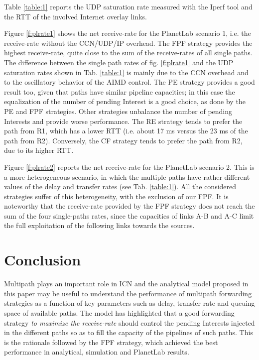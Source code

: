 \documentclass{sig-alternate-10pt}
\begin{document}
Table \ref{table:1} reports the UDP saturation rate measured with the Iperf tool and the RTT of the involved Internet overlay links.

Figure \ref{f:plrate1} shows the net receive-rate for the PlanetLab scenario 1, i.e. the receive-rate without the CCN/UDP/IP overhead. The FPF strategy provides the highest receive-rate, quite close to the sum of the receive-rates of all single paths. The difference between the single path rates of fig. \ref{f:plrate1} and the UDP saturation rates shown in Tab. \ref{table:1} is mainly due to the CCN overhead and to the oscillatory behavior of the AIMD control. The PE strategy provides a good result too, given that paths have similar pipeline capacities; in this case the equalization of the number of pending Interest is a good choice, as done by the PE and FPF strategies. Other strategies unbalance the number of pending Interests and provide worse performance. The RE strategy tends to prefer the path from R1, which has a lower RTT (i.e. about 17 ms versus the 23 ms of the path from R2). Conversely, the CF strategy tends to prefer the path from R2, due to its higher RTT.

Figure \ref{f:plrate2} reports the net receive-rate for the PlanetLab scenario 2. This is a more heterogeneous scenario, in which the multiple paths have rather different values of the delay and transfer rates (see Tab. \ref{table:1}). All the considered strategies suffer of this heterogeneity, with the exclusion of our FPF. It is noteworthy that the receive-rate provided by the FPF strategy does not reach the sum of the four single-paths rates, since the capacities of links A-B and A-C limit the full exploitation of the following links towards the sources.

\section{Conclusion}
Multipath plays an important role in ICN and the analytical model proposed in this paper may be useful to understand the performance of multipath forwarding strategies as a function of key parameters such as delay, transfer rate and queuing space of available paths. The model has highlighted that a good forwarding strategy \textit{to maximize the receive-rate} should control the pending Interests injected in the different paths so as to fill the capacity of the pipelines of such paths. This is the rationale followed by the FPF strategy, which achieved the best performance in analytical, simulation and PlanetLab results.
\end{document}
